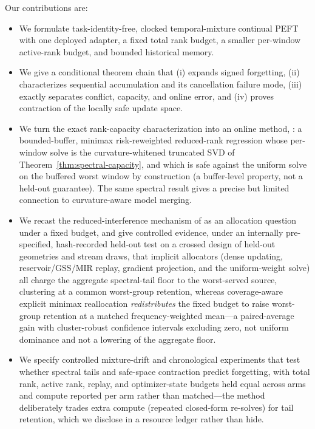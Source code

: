 Our contributions are:
\begin{itemize}
  \item We formulate task-identity-free, clocked temporal-mixture continual
  PEFT with one deployed adapter, a fixed total rank budget, a smaller
  per-window active-rank budget, and bounded historical memory.
  \item We give a conditional theorem chain that (i) expands signed forgetting,
  (ii) characterizes sequential accumulation and its cancellation failure mode,
  (iii) exactly separates conflict, capacity, and online error, and (iv) proves
  contraction of the locally safe update space.
  \item We turn the exact rank-capacity characterization into an online method,
  \method{}: a bounded-buffer, minimax risk-reweighted reduced-rank regression
  whose per-window solve is the curvature-whitened truncated SVD of
  Theorem~\ref{thm:spectral-capacity}, and which is safe against the uniform
  solve on the buffered worst window by construction (a buffer-level property,
  not a held-out guarantee). The same spectral result gives a precise but limited
  connection to curvature-aware model merging.
  \item We recast the reduced-interference mechanism of \citet{huang2026larger}
  as an allocation question under a fixed budget, and give controlled evidence,
  under an internally pre-specified, hash-recorded held-out test on a crossed
  design of held-out geometries and stream draws, that implicit allocators (dense
  updating, reservoir/GSS/MIR replay, gradient projection, and the uniform-weight
  solve) all charge the aggregate spectral-tail floor to the worst-served source,
  clustering at a common worst-group retention, whereas coverage-aware explicit
  minimax reallocation \emph{redistributes} the fixed budget to raise worst-group
  retention at a matched frequency-weighted mean---a paired-average gain with
  cluster-robust confidence intervals excluding zero, not uniform dominance and
  not a lowering of the aggregate floor.
  \item We specify controlled mixture-drift and chronological experiments that
  test whether spectral tails and safe-space contraction predict forgetting,
  with total rank, active rank, replay, and optimizer-state budgets held equal
  across arms and compute reported per arm rather than matched---the method
  deliberately trades extra compute (repeated closed-form re-solves) for tail
  retention, which we disclose in a resource ledger rather than hide.
\end{itemize}
